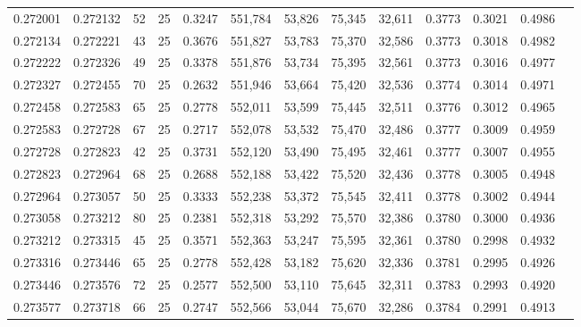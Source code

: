 \begin{tabular}{rrrrrrrrrrrrr}
0.272001 & 0.272132 &    52 &  25 &                                     0.3247 & 551,784 &  53,826 &  75,345 &  32,611 & 0.3773 & 0.3021 & 0.4986 \\
0.272134 & 0.272221 &    43 &  25 &                                     0.3676 & 551,827 &  53,783 &  75,370 &  32,586 & 0.3773 & 0.3018 & 0.4982 \\
0.272222 & 0.272326 &    49 &  25 &                                     0.3378 & 551,876 &  53,734 &  75,395 &  32,561 & 0.3773 & 0.3016 & 0.4977 \\
0.272327 & 0.272455 &    70 &  25 &                                     0.2632 & 551,946 &  53,664 &  75,420 &  32,536 & 0.3774 & 0.3014 & 0.4971 \\
0.272458 & 0.272583 &    65 &  25 &                                     0.2778 & 552,011 &  53,599 &  75,445 &  32,511 & 0.3776 & 0.3012 & 0.4965 \\
0.272583 & 0.272728 &    67 &  25 &                                     0.2717 & 552,078 &  53,532 &  75,470 &  32,486 & 0.3777 & 0.3009 & 0.4959 \\
0.272728 & 0.272823 &    42 &  25 &                                     0.3731 & 552,120 &  53,490 &  75,495 &  32,461 & 0.3777 & 0.3007 & 0.4955 \\
0.272823 & 0.272964 &    68 &  25 &                                     0.2688 & 552,188 &  53,422 &  75,520 &  32,436 & 0.3778 & 0.3005 & 0.4948 \\
0.272964 & 0.273057 &    50 &  25 &                                     0.3333 & 552,238 &  53,372 &  75,545 &  32,411 & 0.3778 & 0.3002 & 0.4944 \\
0.273058 & 0.273212 &    80 &  25 &                                     0.2381 & 552,318 &  53,292 &  75,570 &  32,386 & 0.3780 & 0.3000 & 0.4936 \\
0.273212 & 0.273315 &    45 &  25 &                                     0.3571 & 552,363 &  53,247 &  75,595 &  32,361 & 0.3780 & 0.2998 & 0.4932 \\
0.273316 & 0.273446 &    65 &  25 &                                     0.2778 & 552,428 &  53,182 &  75,620 &  32,336 & 0.3781 & 0.2995 & 0.4926 \\
0.273446 & 0.273576 &    72 &  25 &                                     0.2577 & 552,500 &  53,110 &  75,645 &  32,311 & 0.3783 & 0.2993 & 0.4920 \\
0.273577 & 0.273718 &    66 &  25 &                                     0.2747 & 552,566 &  53,044 &  75,670 &  32,286 & 0.3784 & 0.2991 & 0.4913 \\

\end{tabular}
